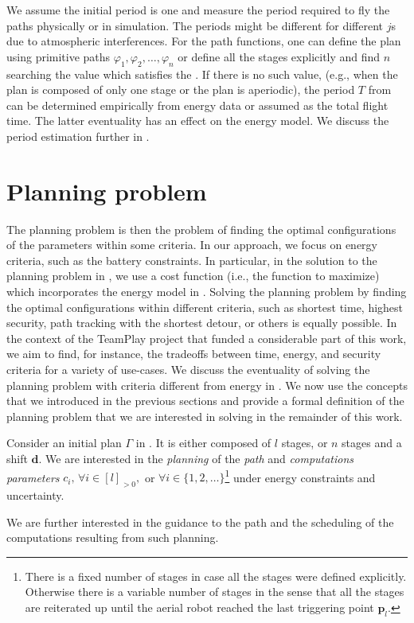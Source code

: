 We assume the initial period is one and measure the period required to fly the paths physically or in simulation. The periods might be different for different $j$s due to atmospheric interferences. For the path functions, one can define the plan using primitive paths $\varphi_1,\varphi_2,\dots,\varphi_n$ or define all the stages explicitly and find $n$ searching the value which satisfies the . If there is no such value, (e.g., when the plan is composed of only one stage or the plan is aperiodic), the period $T$ from  can be determined empirically from energy data or assumed as the total flight time. The latter eventuality has an effect on the energy model. We discuss the period estimation further in .


\section{Planning problem}
\label{sec:plan-pb}

The planning problem is then the problem of finding the optimal configurations of the parameters within some criteria. In our approach, we focus on energy criteria, such as the battery constraints. In particular, in the solution to the planning problem in , we use a cost function (i.e., the function to maximize) which incorporates the energy model in . Solving the planning problem by finding the optimal configurations within different criteria, such as shortest time, highest security, path tracking with the shortest detour, or others is equally possible. In the context of the TeamPlay project that funded a considerable part of this work, we aim to find, for instance, the tradeoffs between time, energy, and security criteria for a variety of use-cases. We discuss the eventuality of solving the planning problem with criteria different from energy in . We now use the concepts that we introduced in the previous sections and provide a formal definition of the planning problem that we are interested in solving in the remainder of this work.

\begin{highlight}
\begin{pb}\label{pb}
  Consider an initial plan $\Gamma$ in . It is either composed of $l$ stages, or $n$ stages and a shift $\mathbf{d}$. We are interested in the \emph{planning} of the \emph{path} and \emph{computations parameters} $c_i,\,\forall i\in[l]_{>0},$ or $\forall i\in\{1,2,\dots\}$\footnote{There is a fixed number of stages in case all the stages were defined explicitly. Otherwise there is a variable number of stages in the sense that all the stages are reiterated up until the aerial robot reached the last triggering point $\mathbf{p}_l$.} under energy constraints and uncertainty.
  
  We are further interested in the guidance to the path and the scheduling of the computations resulting from such planning.
\end{pb}    
\end{highlight}


